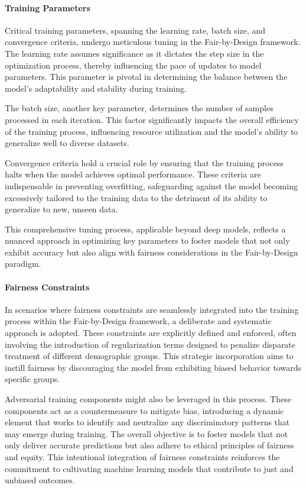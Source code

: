 \paragraph{Training Parameters}

Critical training parameters, spanning the learning rate, batch size, and convergence criteria, undergo meticulous tuning in the Fair-by-Design framework. The learning rate assumes significance as it dictates the step size in the optimization process, thereby influencing the pace of updates to model parameters. This parameter is pivotal in determining the balance between the model's adaptability and stability during training.

The batch size, another key parameter, determines the number of samples processed in each iteration. This factor significantly impacts the overall efficiency of the training process, influencing resource utilization and the model's ability to generalize well to diverse datasets.

Convergence criteria hold a crucial role by ensuring that the training process halts when the model achieves optimal performance. These criteria are indispensable in preventing overfitting, safeguarding against the model becoming excessively tailored to the training data to the detriment of its ability to generalize to new, unseen data.

This comprehensive tuning process, applicable beyond deep models, reflects a nuanced approach in optimizing key parameters to foster models that not only exhibit accuracy but also align with fairness considerations in the Fair-by-Design paradigm.

\paragraph{Fairness Constraints}

In scenarios where fairness constraints are seamlessly integrated into the training process within the Fair-by-Design framework, a deliberate and systematic approach is adopted. These constraints are explicitly defined and enforced, often involving the introduction of regularization terms designed to penalize disparate treatment of different demographic groups. This strategic incorporation aims to instill fairness by discouraging the model from exhibiting biased behavior towards specific groups.

Adversarial training components might also be leveraged in this process. These components act as a countermeasure to mitigate bias, introducing a dynamic element that works to identify and neutralize any discriminatory patterns that may emerge during training. The overall objective is to foster models that not only deliver accurate predictions but also adhere to ethical principles of fairness and equity. This intentional integration of fairness constraints reinforces the commitment to cultivating machine learning models that contribute to just and unbiased outcomes.

